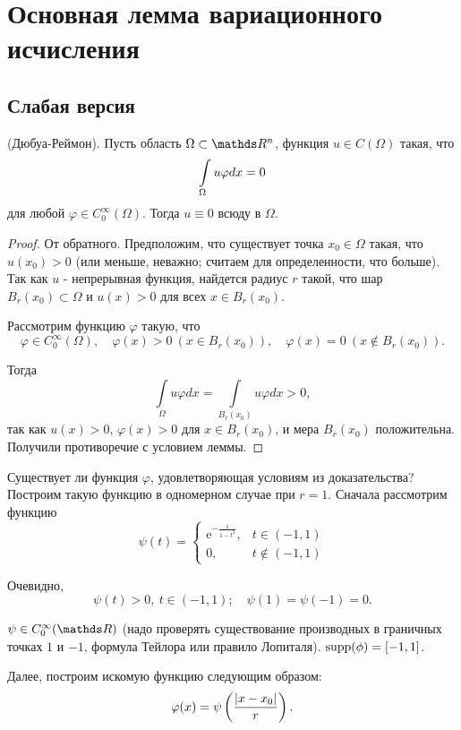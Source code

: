 \section{Основная лемма вариационного исчисления}
\subsection{Слабая версия}
\begin{lemma}{(Дюбуа-Реймон).}
Пусть область $\Omega \subset \real^n$, функция $u \in C(\Omega)$ такая, что 
$$\displaystyle \int \limits_{\Omega} u \varphi dx = 0$$ 
для любой $\varphi \in C_0^\infty(\Omega)$. Тогда $u \equiv 0$ всюду в $\Omega$.
\end{lemma}

\begin{proof}
От обратного. Предположим, что существует точка $x_0 \in \Omega$ такая, что $u(x_0) > 0$ (или меньше, неважно; считаем для определенности, что больше). 
Так как $u$ - непрерывная функция, найдется радиус $r$ такой, что шар $B_r(x_0) \subset \Omega$ и $u(x) > 0$ для всех $x \in B_r(x_0)$.

Рассмотрим функцию $\varphi$ такую, что 
$$\varphi \in C_0^\infty(\Omega),\quad \varphi(x) > 0 \ (x \in B_r(x_0)),\quad \varphi(x) = 0 \ (x \notin B_r(x_0)).$$

Тогда
$$\int \limits_{\Omega} u \varphi dx = \int \limits_{B_r(x_0)} u \varphi dx > 0,$$ 
так как $u(x) > 0$, $\varphi(x) > 0$ для $x \in B_r(x_0)$, и мера $B_r(x_0)$ положительна. Получили противоречие с условием леммы.
\end{proof}

\begin{note}
Существует ли функция $\varphi$, удовлетворяющая условиям из доказательства? 
Построим такую функцию в одномерном случае при $r = 1$. Сначала рассмотрим функцию
$$
    \psi(t) =
        \begin{cases} 
            \mathrm{e}^{-\frac{1}{1 - t^2}}, & t \in (-1, 1) \\
            0, & t \notin (-1, 1) 
        \end{cases}
$$

Очевидно, 
$$\psi(t) > 0, \ t \in (-1, 1); \quad \psi(1) = \psi(-1) = 0.$$ 

$\psi \in C_0^\infty(\real)$ (надо проверять существование производных в граничных точках $1$ и $-1$, формула Тейлора или правило Лопиталя). 
$\operatorname{supp}(\phi) = [-1, 1]$.

Далее, построим искомую функцию следующим образом:
$$\varphi(x) = \psi \left(\frac{\lvert x - x_0\rvert}{r}\right).$$
\end{note}

